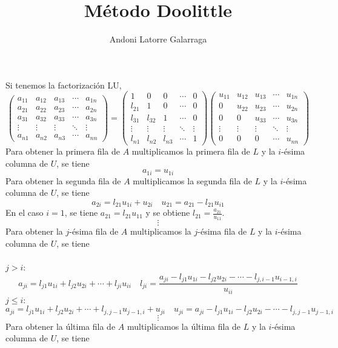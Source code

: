 \documentclass{article}
\title{Método Doolittle}
\author{Andoni Latorre Galarraga}
\date{}
\begin{document}
\maketitle
\noindent Si tenemos la factorización LU,
$$
\begin{pmatrix}
a_{11} & a_{12} & a_{13} & \cdots & a_{1n}\\ 
a_{21} & a_{22} & a_{23} & \cdots & a_{2n}\\ 
a_{31} & a_{32} & a_{33} & \cdots & a_{3n}\\ 
\vdots & \vdots & \vdots & \ddots & \vdots\\ 
a_{n1} & a_{n2} & a_{n3} & \cdots & a_{nn}
\end{pmatrix}
=
\begin{pmatrix}
1 & 0 & 0 & \cdots & 0\\ 
l_{21} & 1 & 0 & \cdots & 0\\ 
l_{31} & l_{32} & 1 & \cdots & 0\\ 
\vdots & \vdots & \vdots & \ddots & \vdots\\ 
l_{n1} & l_{n2} & l_{n3} & \cdots & 1
\end{pmatrix}
\begin{pmatrix}
u_{11} & u_{12} & u_{13} & \cdots & u_{1n}\\ 
0 & u_{22} & u_{23} & \cdots & u_{2n}\\ 
0 & 0 & u_{33} & \cdots & u_{3n}\\ 
\vdots & \vdots & \vdots & \ddots & \vdots\\ 
0 & 0 & 0 & \cdots & u_{nn}
\end{pmatrix}
$$
Para obtener la primera fila de $A$ multiplicamos la primera fila de $L$ y la $i$-ésima columna de $U$, se tiene
$$
a_{1i}=u_{1i}
$$
Para obtener la segunda fila de $A$ multiplicamos la segunda fila de $L$ y la $i$-ésima columna de $U$, se tiene
$$
a_{2i}=l_{21}u_{1i}+u_{2i} \quad u_{21} = a_{21}-l_{21}u_{i1}
$$
En el caso $i=1$, se tiene $a_{21}=l_{21}u_{11}$ y se obtiene $l_{21}=\frac{a_{21}}{u_{11}}$.
$$
\vdots
$$
Para obtener la $j$-ésima fila de $A$ multiplicamos la $j$-ésima fila de $L$ y la $i$-ésima columna de $U$, se tiene\\\\
$j>i$:
$$
a_{ji}=l_{j1}u_{1i}+l_{j2}u_{2i}+\cdots+l_{ji}u_{ii} \quad l_{ji}=\frac{a_{ji}-l_{j1}u_{1i}-l_{j2}u_{2i}-\cdots-l_{j,i-1}u_{i-1,i}}{u_{ii}}
$$
$j\le i$:
$$
a_{ji}=l_{j1}u_{1i}+l_{j2}u_{2i}+\cdots+l_{j,j-1}u_{j-1,i}+u_{ji} \quad u_{ji}=a_{ji}-l_{j1}u_{1i}-l_{j2}u_{2i}-\cdots-l_{j,j-1}u_{j-1,i}
$$
$$
\vdots
$$
Para obtener la última fila de $A$ multiplicamos la última fila de $L$ y la $i$-ésima columna de $U$, se tiene\\\\
\end{document}

